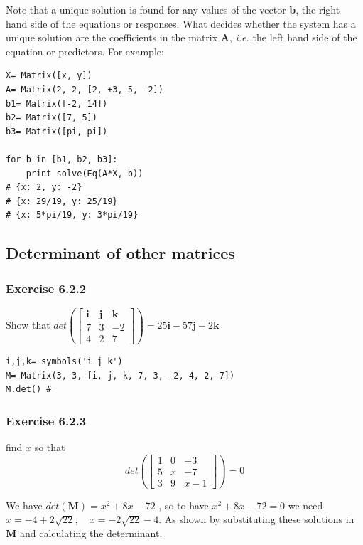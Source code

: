 Note that a unique solution is found for any values of the vector \textbf{b}, the
right hand side of the equations or responses. What decides whether the system has
a unique solution are the coefficients in the matrix \textbf{A}, \emph{i.e.} the
left hand side of the equation or predictors. For example:

\begin{verbatim}
X= Matrix([x, y])
A= Matrix(2, 2, [2, +3, 5, -2])
b1= Matrix([-2, 14])
b2= Matrix([7, 5])
b3= Matrix([pi, pi])

for b in [b1, b2, b3]:
    print solve(Eq(A*X, b))
# {x: 2, y: -2}
# {x: 29/19, y: 25/19}
# {x: 5*pi/19, y: 3*pi/19}
\end{verbatim}

\subsection{Determinant of other matrices}

\subsubsection{Exercise 6.2.2}

Show that $det(\left[\begin{matrix}
\mathbf{i} & \mathbf{j} & \mathbf{k} \\
7 & 3 & -2\\
4 & 2 & 7
\end{matrix}\right]) =
25 \mathbf{i} - 57 \mathbf{j} + 2 \mathbf{k}$

\begin{verbatim}
i,j,k= symbols('i j k')
M= Matrix(3, 3, [i, j, k, 7, 3, -2, 4, 2, 7])
M.det() #
\end{verbatim}

\subsubsection{Exercise 6.2.3}

find $x$ so that
$$
det(\left[\begin{matrix}1 & 0 & -3\\5 & x & -7\\3 & 9 & x - 1\end{matrix}\right]) = 0
$$

We have $det(\mathbf{M}) = x^{2} + 8 x - 72$ , so to have $x^{2} + 8 x - 72 = 0$
we need $x = -4 + 2 \sqrt{22}, \quad x= - 2 \sqrt{22} - 4$. As shown by substituting
these solutions in \textbf{M} and calculating the determinant.

